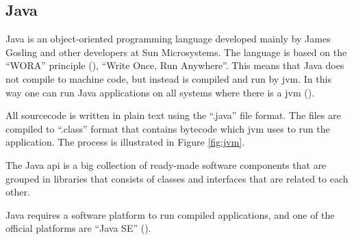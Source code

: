 \subsection{Java}

Java is an object-oriented programming language developed mainly by James Gosling and other developers at Sun Microsystems. The language is based on the ``WORA'' principle (\cite{wora}), ``Write Once, Run Anywhere''. This means that Java does not compile to machine code, but instead is compiled and run by \acrfull{jvm}. In this way one can run Java applications on all systems where there is a \acrshort{jvm} (\cite{java}).

All sourcecode is written in plain text using the ``.java'' file format. The files are compiled to ``.class'' format that contains bytecode which \acrshort{jvm} uses to run the application. The process is illustrated in Figure \ref{fig:jvm}.


The Java \acrfull{api} is a big collection of ready-made software components that are grouped in libraries that consists of classes and interfaces that are related to each other.

Java requires a software platform to run compiled applications, and one of the official platforms are ``Java SE'' (\cite{java}).